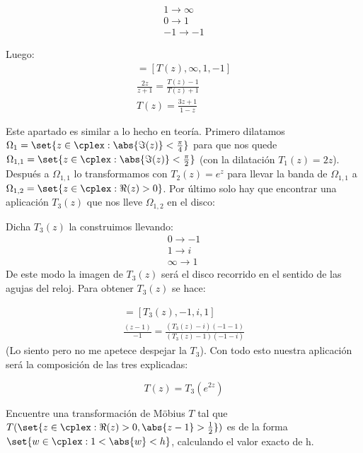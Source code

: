\begin{problem}[10]
\begin{align*}
	1 \to ∞\\
	0 \to 1\\
	-1 \to -1
\end{align*}

Luego:
\begin{align*}
	[z, 1, 0, -1] = [T(z), ∞, 1, -1]\\
	\frac{2z}{z+1} = \frac{T(z) - 1}{T(z) + 1}\\
	T(z) = \frac{3z+1}{1-z}
\end{align*}




\spart {}

Este apartado es similar a lo hecho en teoría. Primero dilatamos $\Omega_{1} = \set{z \in \cplex: \abs{\Im(z)} < \frac{\pi}{4}}$ para que nos quede $\Omega_{1,1} = \set{z \in \cplex: \abs{\Im(z)} < \frac{\pi}{2}}$ (con la dilatación $T_1(z)=2z$). Después a $\Omega_{1,1}$ lo transformamos con $T_2(z) = e^z$ para llevar la banda de $\Omega_{1,1}$ a  $\Omega_{1,2} = \set{z \in \cplex: \Re(z) > 0}$. Por último solo hay que encontrar una aplicación $T_3(z)$ que nos lleve $\Omega_{1,2}$ en el disco:

Dicha $T_3(z)$ la construimos llevando:
\begin{align*}
	0 \to -1\\
	1 \to i\\
	∞ \to 1
\end{align*}
De este modo la imagen de $T_3(z)$ será el disco recorrido en el sentido de las agujas del reloj. Para obtener $T_3(z)$ se hace:

\begin{align*}
	[z, 0, 1, ∞] = [T_3(z), -1, i, 1]\\
	\frac{(z - 1)}{-1} = \frac{(T_3(z) - i)(-1-1)}{(T_3(z) - 1)(-1-i)}
\end{align*}
(Lo siento pero no me apetece despejar la $T_3$). Con todo esto nuestra aplicación será la composición de las tres explicadas:

\[T(z) = T_3(e^{2z})\]

\spart

\end{problem}

\begin{problem}[11]
Encuentre una transformación de Möbius $T$ tal que $T(\set{z \in \cplex: \Re(z) > 0, \abs{z - 1} > \frac{1}{2}})$ es de la forma $\set{w \in \cplex: 1 < \abs{w} < h}$, calculando el valor exacto de h.
\solution

\end{problem}

